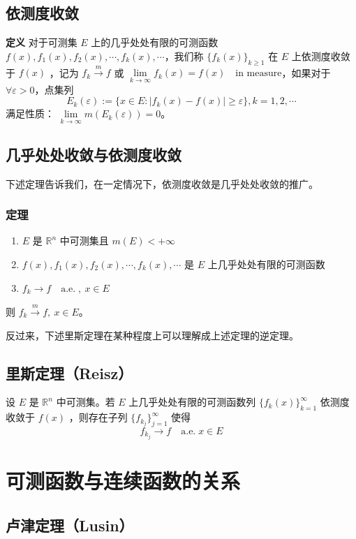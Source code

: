 \documentclass{ctexbook}
\newcommand{\R}{\mathbb{R}}
\newcommand{\nae}{\mathrm{\quad a.e.\; }}
\newcommand{\ITEMS}{\begin{enumerate}[leftmargin=4em]}
\newcommand{\ITEME}{\end{enumerate}}
\begin{document}
\subsection{依测度收敛}

{\bf 定义} 对于可测集 $E$ 上的几乎处处有限的可测函数 $f(x),f_1(x),f_2(x),\cdots,f_k(x),\cdots$，我们称 $\{f_k(x)\}_{k\ge 1}$ 在 $E$ 上依测度收敛于 $f(x)$ ，记为 $f_k \xrightarrow{m} f$ 或 $\lim\limits_{k\to \infty}f_k(x)=f(x)\quad \mbox{in measure}$，如果对于 $\forall \varepsilon > 0$，点集列
\[
E_k(\varepsilon) := \{x\in E:\lvert f_k(x) - f(x)\rvert \ge \varepsilon\}, k=1, 2, \cdots 
\]
满足性质： $\lim\limits_{k\to\infty} m(E_k(\varepsilon)) = 0$。

\subsection{几乎处处收敛与依测度收敛}

下述定理告诉我们，在一定情况下，依测度收敛是几乎处处收敛的推广。

\subsubsection{定理}
\ITEMS
\item $E$ 是 $\R^n$ 中可测集且 $m(E) < +\infty$
\item $f(x),f_1(x),f_2(x),\cdots,f_k(x),\cdots$ 是 $E$ 上几乎处处有限的可测函数
\item $f_k \to f \nae,\ x\in E$
\ITEME 
则 $f_k \xrightarrow{m}f,\ x\in E$。

反过来，下述里斯定理在某种程度上可以理解成上述定理的逆定理。

\subsection{里斯定理（Reisz）}

设 $E$ 是 $\R^n$ 中可测集。若 $E$ 上几乎处处有限的可测函数列 $\{f_k(x)\}_{k=1}^{\infty}$ 依测度收敛于 $f(x)$ ，则存在子列 $\{f_{k_j}\}_{j=1}^{\infty}$ 使得
\[
f_{k_j} \to f \nae x \in E
\]

\section{可测函数与连续函数的关系}

\subsection{卢津定理（Lusin）}
\end{document}
